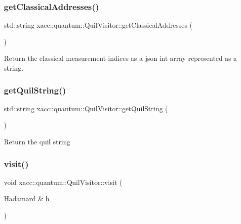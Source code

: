 \subsubsection{\texorpdfstring{get\+Classical\+Addresses()}{getClassicalAddresses()}}
{\footnotesize\ttfamily std\+::string xacc\+::quantum\+::\+Quil\+Visitor\+::get\+Classical\+Addresses (\begin{DoxyParamCaption}{ }\end{DoxyParamCaption})\hspace{0.3cm}{\ttfamily [inline]}}

Return the classical measurement indices as a json int array represented as a string. \mbox{\label{a01208_a9808ecc5766ea2c387107dff6b64cdb8}} 
\subsubsection{\texorpdfstring{get\+Quil\+String()}{getQuilString()}}
{\footnotesize\ttfamily std\+::string xacc\+::quantum\+::\+Quil\+Visitor\+::get\+Quil\+String (\begin{DoxyParamCaption}{ }\end{DoxyParamCaption})\hspace{0.3cm}{\ttfamily [inline]}}

Return the quil string \mbox{\label{a01208_a5470d573fdcfd691c100fcbfeeed45db}} 
\subsubsection{\texorpdfstring{visit()}{visit()}\hspace{0.1cm}{\footnotesize\ttfamily [1/6]}}
{\footnotesize\ttfamily void xacc\+::quantum\+::\+Quil\+Visitor\+::visit (\begin{DoxyParamCaption}\item[{\hyperlink{a01308}{Hadamard} \&}]{h }\end{DoxyParamCaption})\hspace{0.3cm}{\ttfamily [inline]}}

